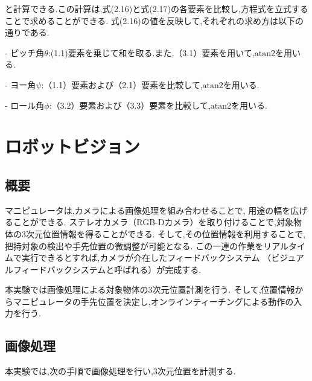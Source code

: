 と計算できる.この計算は,式(2.16)と式(2.17)の各要素を比較し,方程式を立式することで求めることができる.
式(2.16)の値を反映して,それぞれの求め方は以下の通りである.


- ピッチ角$\theta$:(1.1)要素を乗じて和を取る.また,（3.1）要素を用いて,$\text{atan2}$を用いる.


- ヨー角$\psi$:（1.1）要素および（2.1）要素を比較して,$\text{atan2}$を用いる.


- ロール角$\phi$:（3.2）要素および（3.3）要素を比較して,$\text{atan2}$を用いる.


\section{ロボットビジョン}

\subsection{概要}
マニピュレータは,カメラによる画像処理を組み合わせることで,
用途の幅を広げることができる.
ステレオカメラ（RGB-Dカメラ）を取り付けることで,対象物体の3次元位置情報を得ることができる.
そして,その位置情報を利用することで,把持対象の検出や手先位置の微調整が可能となる.
この一連の作業をリアルタイムで実行できるとすれば,カメラが介在したフィードバックシステム
（ビジュアルフィードバックシステムと呼ばれる）が完成する.

本実験では画像処理による対象物体の3次元位置計測を行う.
そして,位置情報からマニピュレータの手先位置を決定し,オンラインティーチングによる動作の入力を行う.

\subsection{画像処理}
本実験では,次の手順で画像処理を行い,3次元位置を計測する.

